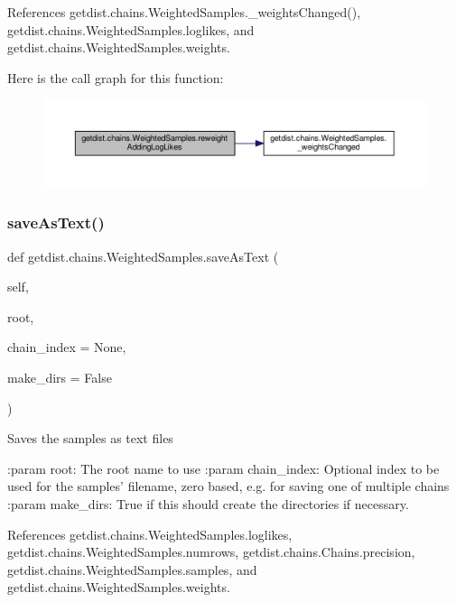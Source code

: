 References getdist.\+chains.\+Weighted\+Samples.\+\_\+weights\+Changed(), getdist.\+chains.\+Weighted\+Samples.\+loglikes, and getdist.\+chains.\+Weighted\+Samples.\+weights.

Here is the call graph for this function\+:
\nopagebreak
\begin{figure}[H]
\begin{center}
\leavevmode
\includegraphics[width=350pt]{classgetdist_1_1chains_1_1WeightedSamples_a92b26d5dd4a59044bcf0977deb5a77df_cgraph}
\end{center}
\end{figure}
\mbox{\label{classgetdist_1_1chains_1_1WeightedSamples_a934090c8c7d816f926533458ad57973d}} 
\subsubsection{\texorpdfstring{save\+As\+Text()}{saveAsText()}}
{\footnotesize\ttfamily def getdist.\+chains.\+Weighted\+Samples.\+save\+As\+Text (\begin{DoxyParamCaption}\item[{}]{self,  }\item[{}]{root,  }\item[{}]{chain\+\_\+index = {\ttfamily None},  }\item[{}]{make\+\_\+dirs = {\ttfamily False} }\end{DoxyParamCaption})}

\begin{DoxyVerb}Saves the samples as text files

:param root: The root name to use
:param chain_index: Optional index to be used for the samples' filename, zero based, e.g. for saving one of multiple chains
:param make_dirs: True if this should create the directories if necessary.
\end{DoxyVerb}
 

References getdist.\+chains.\+Weighted\+Samples.\+loglikes, getdist.\+chains.\+Weighted\+Samples.\+numrows, getdist.\+chains.\+Chains.\+precision, getdist.\+chains.\+Weighted\+Samples.\+samples, and getdist.\+chains.\+Weighted\+Samples.\+weights.

